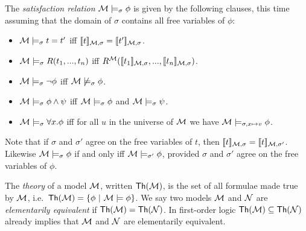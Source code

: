 \NI The \emph{satisfaction relation} $\mathcal{M} \models_{\sigma} \phi$
is given by the following clauses, this time assuming that the domain
of $\sigma$ contains all free variables of $\phi$:
\begin{itemize}

\item $\mathcal{M} \models_{\sigma} t = t'$ iff $\lbrack\!\lbrack t \rbrack\!\rbrack_{\mathcal{M}, \sigma} = \lbrack\!\lbrack t' \rbrack\!\rbrack_{\mathcal{M}, \sigma}$.
\item $\mathcal{M} \models_{\sigma} R(t_1, ..., t_n)$ iff
  $R^{\mathcal{M}}(\lbrack\!\lbrack t_1 \rbrack\!\rbrack_{\mathcal{M}, \sigma}, ..., \lbrack\!\lbrack t_n \rbrack\!\rbrack_{\mathcal{M},
  \sigma})$.
\item $\mathcal{M} \models_{\sigma} \neg \phi$ iff $\mathcal{M} \not\models_{\sigma} \phi$.
\item $\mathcal{M} \models_{\sigma} \phi \land \psi$ iff $\mathcal{M} \models_{\sigma} \phi$ and $\mathcal{M} \models_{\sigma} \psi$.
\item $\mathcal{M} \models_{\sigma} \forall x.\phi$ iff for all $u$ in the
  universe of $\mathcal{M}$ we have $\mathcal{M} \models_{\sigma, x \mapsto v} \phi$.

\end{itemize}

\NI Note that if $\sigma$ and $\sigma'$ agree on the free variables of
$t$, then $\lbrack\!\lbrack t \rbrack\!\rbrack_{\mathcal{M}, \sigma} =\lbrack\!\lbrack t \rbrack\!\rbrack_{\mathcal{M},
  \sigma'}$. Likewise $\mathcal{M} \models_{\sigma} \phi$ if and only iff
$\mathcal{M} \models_{\sigma'} \phi$, provided $\sigma$ and $\sigma'$ agree
on the free variables of $\phi$.

The \emph{theory} of a model $\mathcal{M}$, written $\mathsf{Th}(\mathcal{M})$, is
the set of all formulae made true by $\mathcal{M}$, i.e.~$\mathsf{Th}(\mathcal{M})
= \{\phi\ |\ \mathcal{M}\models \phi\}$. We say two models $\mathcal{M}$ and
$\mathcal{N}$ are \emph{elementarily equivalent} if $\mathsf{Th}(\mathcal{M}) =
\mathsf{Th}(\mathcal{N})$. In first-order logic $\mathsf{Th}(\mathcal{M}) \subseteq
\mathsf{Th}(\mathcal{N})$ already implies that $\mathcal{M}$ and $\mathcal{N}$ are
elementarily equivalent.
